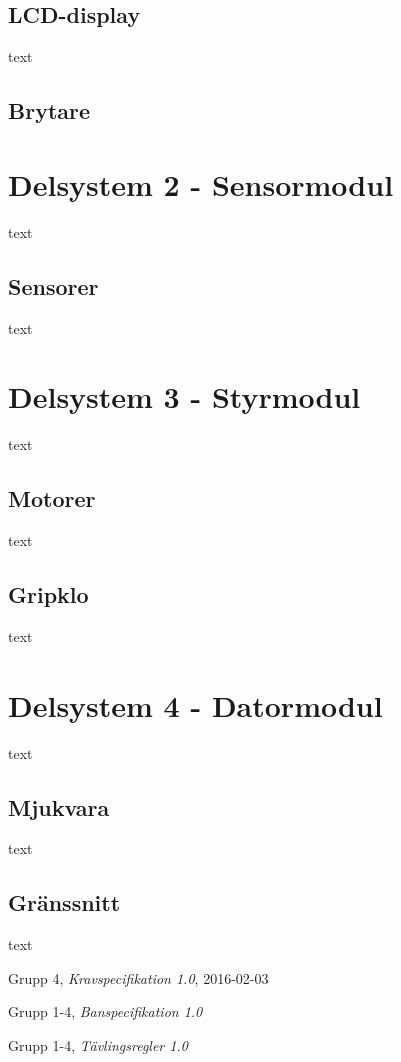 \documentclass[11pt]{article}
\begin{document}
\begin{flushleft}
\subsection{LCD-display}
text
\subsection{Brytare}

\pagebreak
\section{Delsystem 2 - Sensormodul}
\label{sec:sensormodul}
text
\subsection{Sensorer}
text

\pagebreak
\section{Delsystem 3 - Styrmodul}
text
\subsection{Motorer}
text
\subsection{Gripklo}
text

\pagebreak
\section{Delsystem 4 - Datormodul}
text
\subsection{Mjukvara}
text
\subsection{Gränssnitt}
text

\setcounter{secnumdepth}{0}
\pagebreak
\begin{thebibliography}{9}

  Grupp 4,
  \emph{Kravspecifikation 1.0},
  2016-02-03
  
	Grupp 1-4,
	\emph{Banspecifikation 1.0}
	
	Grupp 1-4,
	\emph{Tävlingsregler 1.0}

\end{thebibliography}

\setcounter{secnumdepth}{2}

\end{flushleft}
\end{document}
